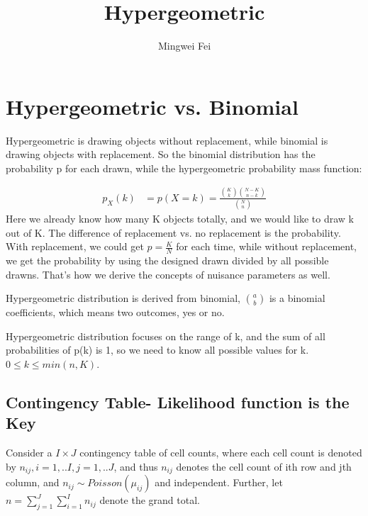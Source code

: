 \documentclass[11pt]{article} %
\title{Hypergeometric}
\author{Mingwei Fei}
\begin{document}
	
	\maketitle
	
\section{Hypergeometric vs. Binomial}
	Hypergeometric is drawing objects without replacement, while binomial is drawing objects with replacement. So the binomial distribution has the probability p for each drawn, while the hypergeometric probability mass function:
	
	\begin{align*}
		p_X(k) &= p(X=k) = \frac{{K \choose k} {N-K \choose n-k}}{ {N \choose n}}
	\end{align*}
	Here we already know how many K objects totally, and we would like to draw k out of K. The difference of replacement vs. no replacement is the probability. With replacement, we could get $p= \frac{K}{N}$ for each time, while without replacement, we get the probability by using the designed drawn divided by all possible drawns. That's how we derive the concepts of nuisance parameters as well.
	
	Hypergeometric distribution is derived from binomial, $a \choose b$ is a binomial coefficients, which means two outcomes, yes or no. 

	Hypergeometric distribution focuses on the range of k, and the sum of all probabilities of p(k) is 1, so we need to know all possible values for k. $ 0 \leq k \leq min(n, K)$.
	

\subsection{Contingency Table- Likelihood function is the Key}
Consider a $I \times J$ contingency table of cell counts, where each cell count is denoted by $n_{ij}, i=1,..I, j=1,..J$, and thus $n_{ij}$ denotes the cell count of ith row and jth column, and $n_{ij} \sim Poisson (\mu_{ij})$ and independent. Further, let $n= \sum_{j=1}^J \sum_{i=1}^I n_{ij}$ denote the grand total.
\end{document}
